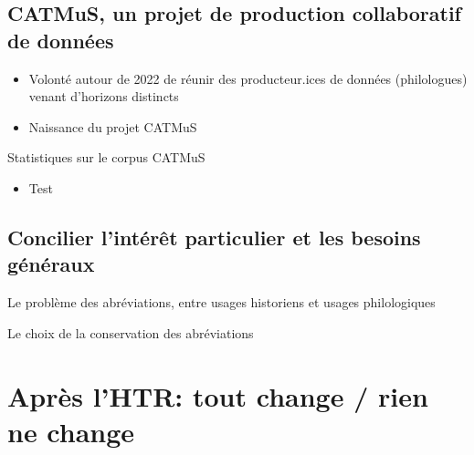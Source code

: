 \documentclass[11pt,aspectratio=169]{beamer}
\begin{document}
\subsection{CATMuS, un projet de production collaboratif de données}

\begin{frame}
\begin{itemize}
\item Volonté autour de 2022 de réunir des producteur.ices de données (philologues) venant d'horizons distincts
\item Naissance du projet CATMuS
\end{itemize}
\end{frame}


\begin{frame}{Statistiques sur le corpus CATMuS}
\begin{itemize}
\item Test
\end{itemize}
\end{frame}

\subsection{Concilier l'intérêt particulier et les besoins généraux}

\begin{frame}{Le problème des abréviations, entre usages historiens et usages philologiques}

\end{frame}


\begin{frame}{Le choix de la conservation des abréviations}
\begin{center}



\end{center}
\end{frame}

\section{Après l'HTR: tout change / rien ne change}
\end{document}
